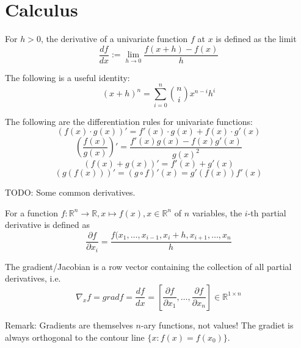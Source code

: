\section{Calculus}
For $h > 0$, the derivative of a univariate function $f$ at $x$ is defined as
the limit
\begin{equation*}
    \frac{df}{dx} := \lim_{h \to 0}{\frac{f(x + h) - f(x)}{h}}
\end{equation*}

The following is a useful identity:
\begin{equation*}
    (x + h)^n = \sum_{i = 0}^n{\binom{n}{i} x^{n - i}h^i}
\end{equation*}

The following are the differentiation rules for univariate functions:
\begin{equation*}
    (f(x) \cdot g(x))' = f'(x) \cdot g(x) + f(x) \cdot g'(x)
\end{equation*}
\begin{equation*}
    \left( \frac{f(x)}{g(x)} \right)' = \frac{f'(x) g(x) - f(x) g'(x)}{g(x)^2}
\end{equation*}
\begin{equation*}
    (f(x) + g(x))' = f'(x) + g'(x)
\end{equation*}
\begin{equation*}
    (g(f(x)))' = (g \circ f)'(x) = g'(f(x)) f'(x)
\end{equation*}

TODO: Some common derivatives.

For a function $f : \mathbb{R}^n \to \mathbb{R}, x \mapsto f(x), x \in \mathbb{R}^n$
of $n$ variables, the $i$-th partial derivative is defined as
\begin{equation*}
    \frac{\partial f}{\partial x_i} = \frac{f(x_1, \dotsc, x_{i - 1}, x_i + h, x_{i + 1}, \dotsc, x_n}{h}
\end{equation*}

The gradient/Jacobian is a row vector containing the collection of all partial derivatives, i.e.
\begin{equation*}
    \nabla_x{f} = grad f = \frac{d f}{d x} = \left[ \frac{\partial f}{\partial x_1}, \dotsc, \frac{\partial f}{\partial x_n} \right] \in \mathbb{R}^{1 \times n}
\end{equation*}

Remark: Gradients are themselves $n$-ary functions, not values!
The gradiet is always orthogonal to the contour line
$\{x : f(x) = f(x_0)\}$.

